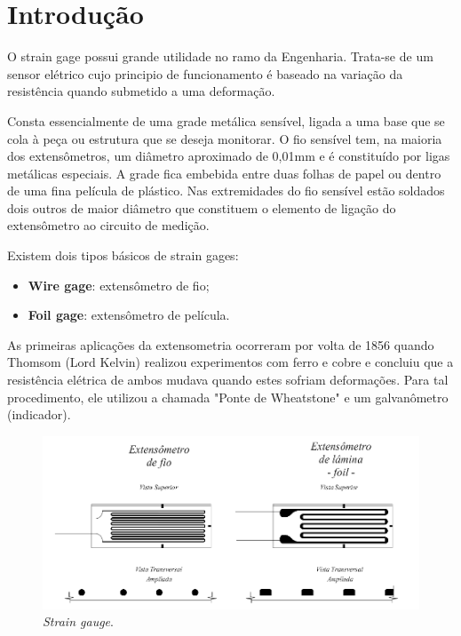 \newpage
\section{Introdução}

O strain gage possui grande utilidade no ramo da Engenharia. Trata-se de um sensor elétrico cujo principio de funcionamento é baseado na variação da resistência quando submetido a uma deformação.

Consta essencialmente de uma grade metálica sensível, ligada a uma base que se cola à peça ou estrutura que se deseja monitorar. O fio sensível tem, na maioria dos extensômetros, um diâmetro aproximado de 0,01mm e é constituído por ligas metálicas especiais. A grade fica embebida entre duas folhas de papel ou dentro de uma fina película de plástico. Nas extremidades do fio sensível estão soldados dois outros de maior diâmetro que constituem o elemento de ligação do extensômetro ao circuito de medição.

Existem dois tipos básicos de strain gages:

\begin{itemize}
    \item \textbf{Wire gage}: extensômetro de fio;
    \item \textbf{Foil gage}: extensômetro de película.
\end{itemize}

As primeiras aplicações da extensometria ocorreram por volta de 1856 quando Thomsom (Lord Kelvin) realizou experimentos com ferro e cobre e concluiu que a resistência elétrica de ambos mudava quando estes sofriam deformações. Para tal procedimento, ele utilizou a chamada "Ponte de Wheatstone" e um galvanômetro (indicador). 

\begin{figure}[H]
    \centering
    \includegraphics[scale=0.9]{img/fi1.png}
    \caption{\textit{Strain gauge}.}
    \label{f_fi1}
\end{figure}

